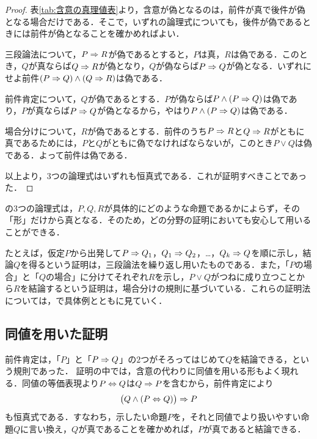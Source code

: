 \begin{tleftbar}
  \begin{proof}
    表\ref{tab:含意の真理値表}より，含意が偽となるのは，前件が真で後件が偽となる場合だけである．そこで，いずれの論理式についても，後件が偽であるときには前件が偽となることを確かめればよい．

    三段論法について，$P \mathrel{\Rightarrow} R$が偽であるとすると，$P$は真，$R$は偽である．このとき，$Q$が真ならば$Q \mathrel{\Rightarrow} R$が偽となり，$Q$が偽ならば$P \mathrel{\Rightarrow} Q$が偽となる．いずれにせよ前件$(P \mathrel{\Rightarrow} Q) \land (Q \mathrel{\Rightarrow} R)$は偽である．

    前件肯定について，$Q$が偽であるとする．$P$が偽ならば$P \land (P \mathrel{\Rightarrow} Q)$は偽であり，$P$が真ならば$P \mathrel{\Rightarrow} Q$が偽となるから，やはり$P \land (P \mathrel{\Rightarrow} Q)$は偽である．

    場合分けについて，$R$が偽であるとする．前件のうち$P \mathrel{\Rightarrow} R$と$Q \mathrel{\Rightarrow} R$がともに真であるためには，$P$と$Q$がともに偽でなければならないが，このとき$P \lor Q$は偽である．よって前件は偽である．

    以上より，$3$つの論理式はいずれも恒真式である．これが証明すべきことであった．
  \end{proof}
\end{tleftbar}

\begin{remark}[推論規則と証明]
  の$3$つの論理式は，$P,Q,R$が具体的にどのような命題であるかによらず，その「形」だけから真となる．そのため，どの分野の証明においても安心して用いることができる．

  たとえば，仮定$P$から出発して$P \mathrel{\Rightarrow} Q_1$，$Q_1 \mathrel{\Rightarrow} Q_2$，\dots，$Q_k \mathrel{\Rightarrow} Q$を順に示し，結論$Q$を得るという証明は，三段論法を繰り返し用いたものである．また，「$P$の場合」と「$Q$の場合」に分けてそれぞれ$R$を示し，$P \lor Q$がつねに成り立つことから$R$を結論するという証明は，場合分けの規則に基づいている．これらの証明法については，で具体例とともに見ていく．
\end{remark}

\subsection{同値を用いた証明}

前件肯定は，「$P$」と「$P \mathrel{\Rightarrow} Q$」の$2$つがそろってはじめて$Q$を結論できる，という規則であった．
証明の中では，含意の代わりに同値を用いる形もよく現れる．同値の等価表現より$P \mathrel{\Leftrightarrow} Q$は$Q \mathrel{\Rightarrow} P$を含むから，前件肯定により
\[
  \bigl( Q \land (P \mathrel{\Leftrightarrow} Q) \bigr) \mathrel{\Rightarrow} P
\]
も恒真式である．すなわち，示したい命題$P$を，それと同値でより扱いやすい命題$Q$に言い換え，$Q$が真であることを確かめれば，$P$が真であると結論できる．

